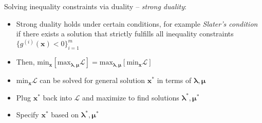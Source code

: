 Solving inequality constraints via duality – \emph{strong duality}:
\begin{itemize}
    \item Strong duality holds under certain conditions, for example \emph{Slater's condition} if there exists a solution that strictly fulfills all inequality constraints $\{g^{(i)}(\boldsymbol{x}) < 0\}_{i=1}^m$
    \item Then, $\textrm{min}_{\boldsymbol{x}} [\textrm{max}_{\boldsymbol{\lambda},\boldsymbol{\mu}} \mathcal{L}] = \textrm{max}_{\boldsymbol{\lambda},\boldsymbol{\mu}} [\textrm{min}_{\boldsymbol{x}} \mathcal{L}]$
    \item $\textrm{min}_{\boldsymbol{x}} \mathcal{L}$ can be solved for general solution $\boldsymbol{x^*}$ in terms of $\boldsymbol{\lambda},\boldsymbol{\mu}$
    \item Plug $\boldsymbol{x^*}$ back into $\mathcal{L}$ and maximize to find solutions $\boldsymbol{\lambda^*},\boldsymbol{\mu^*}$
    \item Specify $\boldsymbol{x^*}$ based on $\boldsymbol{\lambda^*},\boldsymbol{\mu^*}$
\end{itemize}
